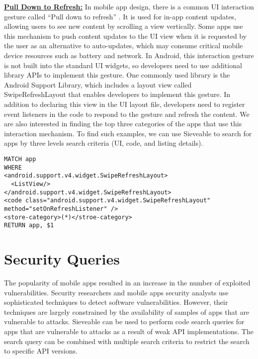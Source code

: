 \underline{\textbf{Pull Down to Refresh:}}
In mobile app design, there is a common UI interaction gesture called ``Pull down to refresh'' \cite{brichter2010user}.
It is used for in-app content updates, allowing users to see new content by scrolling a view vertically.
Some apps use this mechanism to push content updates to the UI view when it is requested by the user as an alternative to auto-updates, which may consume critical mobile device resources such as battery and network.
In Android, this interaction gesture is not built into the standard UI widgets, so developers need to use additional library APIs to implement this gesture.
One commonly used library is the  Android Support Library, which includes a layout view called SwipeRefreshLayout that enables developers to implement this gesture.
In addition to declaring this view in the UI layout file, developers need to register event listeners in the code to respond to the gesture and refresh the content.
We are also interested in finding the top three categories of the apps that use this interaction mechanism.
To find such examples, we can use Sieveable to search for apps by three levels search criteria (UI, code, and listing details).

\begin{verbatim}
MATCH app
WHERE
<android.support.v4.widget.SwipeRefreshLayout>
  <ListView/>
</android.support.v4.widget.SwipeRefreshLayout>
<code class="android.support.v4.widget.SwipeRefreshLayout" method="setOnRefreshListener" />
<store-category>(*)</stroe-category>
RETURN app, $1
\end{verbatim}

\section{Security Queries}
The popularity of mobile apps resulted in an increase in the number of exploited vulnerabilities.
Security researchers and mobile apps security analysts use sophisticated techniques to detect software vulnerabilities.
However, their techniques are largely constrained by the availability of samples of apps that are vulnerable to attacks.
Sieveable can be used to perform code search queries for apps that are vulnerable to attacks as a result of weak API implementations.
The search query can be combined with multiple search criteria to restrict the search to specific API versions.

